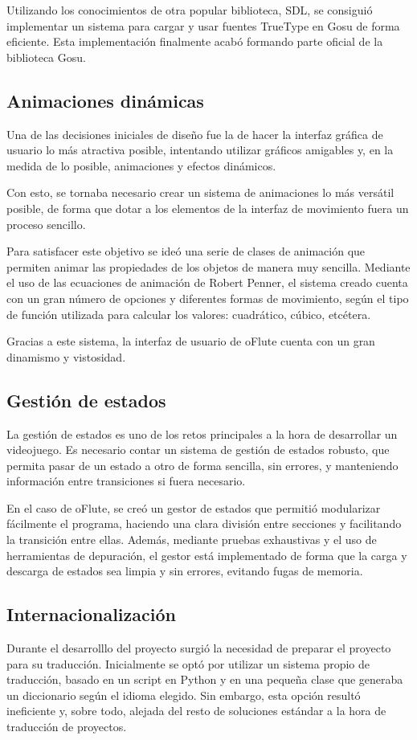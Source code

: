 \documentclass[a4paper,11pt]{article}
\begin{document}
Utilizando los conocimientos de otra popular biblioteca, SDL, se consiguió
implementar un sistema para cargar y usar fuentes TrueType en Gosu de forma
eficiente. Esta implementación finalmente acabó formando parte oficial de la
biblioteca Gosu.

\subsection{Animaciones dinámicas}
Una de las decisiones iniciales de diseño fue la de hacer la interfaz gráfica de
usuario lo más atractiva posible, intentando utilizar gráficos amigables y, en
la medida de lo posible, animaciones y efectos dinámicos.

Con esto, se tornaba necesario crear un sistema de animaciones lo más versátil
posible, de forma que dotar a los elementos de la interfaz de movimiento fuera
un proceso sencillo. 

Para satisfacer este objetivo se ideó una serie de clases de animación que
permiten animar las propiedades de los objetos de manera muy sencilla. Mediante
el uso de las ecuaciones de animación de Robert Penner, el sistema creado cuenta
con un gran número de opciones y diferentes formas de movimiento, según el tipo
de función utilizada para calcular los valores: cuadrático, cúbico, etcétera.

Gracias a este sistema, la interfaz de usuario de oFlute cuenta con un gran
dinamismo y vistosidad.

\subsection{Gestión de estados}
La gestión de estados es uno de los retos principales a la hora de desarrollar
un videojuego. Es necesario contar un sistema de gestión de estados robusto, que
permita pasar de un estado a otro de forma sencilla, sin errores, y manteniendo
información entre transiciones si fuera necesario.

En el caso de oFlute, se creó un gestor de estados que permitió modularizar
fácilmente el programa, haciendo una clara división entre secciones y
facilitando la transición entre ellas. Además, mediante pruebas exhaustivas y el
uso de herramientas de depuración, el gestor está implementado de forma que la
carga y descarga de estados sea limpia y sin errores, evitando fugas de memoria.

\subsection{Internacionalización}
Durante el desarrolllo del proyecto surgió la necesidad de preparar el proyecto
para su traducción. Inicialmente se optó por utilizar un sistema propio de
traducción, basado en un script en Python y en una pequeña clase que generaba un
diccionario según el idioma elegido. Sin embargo, esta opción resultó
ineficiente y, sobre todo, alejada del resto de soluciones estándar a la hora de
traducción de proyectos. 
\end{document}
